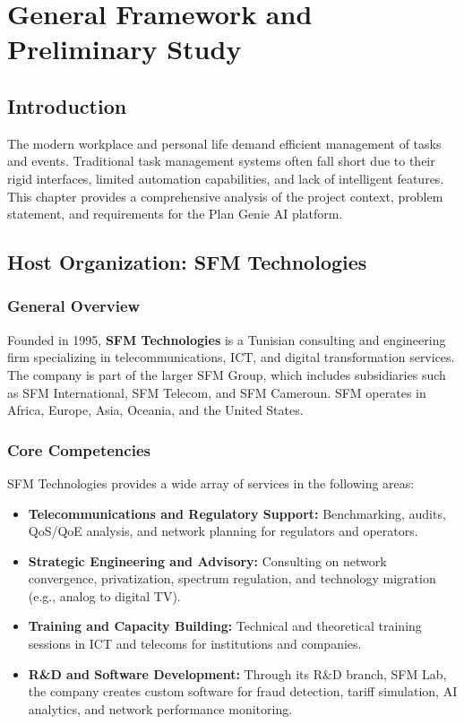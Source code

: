 \documentclass[12pt,a4paper]{article}
\begin{document}
\newpage
\section{General Framework and Preliminary Study}

\subsection*{Introduction}

The modern workplace and personal life demand efficient management of tasks and events. Traditional task management systems often fall short due to their rigid interfaces, limited automation capabilities, and lack of intelligent features. This chapter provides a comprehensive analysis of the project context, problem statement, and requirements for the Plan Genie AI platform.

\subsection{Host Organization: SFM Technologies}
\subsubsection{General Overview}
Founded in 1995, \textbf{SFM Technologies} is a Tunisian consulting and engineering firm specializing in telecommunications, ICT, and digital transformation services. The company is part of the larger SFM Group, which includes subsidiaries such as SFM International, SFM Telecom, and SFM Cameroun. SFM operates in Africa, Europe, Asia, Oceania, and the United States.


\subsubsection{Core Competencies}
SFM Technologies provides a wide array of services in the following areas:

\begin{itemize}
  \item \textbf{Telecommunications and Regulatory Support:} Benchmarking, audits, QoS/QoE analysis, and network planning for regulators and operators.
  \item \textbf{Strategic Engineering and Advisory:} Consulting on network convergence, privatization, spectrum regulation, and technology migration (e.g., analog to digital TV).
  \item \textbf{Training and Capacity Building:} Technical and theoretical training sessions in ICT and telecoms for institutions and companies.
  \item \textbf{R\&D and Software Development:} Through its R\&D branch, SFM Lab, the company creates custom software for fraud detection, tariff simulation, AI analytics, and network performance monitoring.
\end{itemize}
\end{document}
